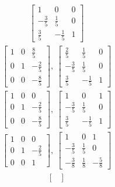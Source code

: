\documentclass[12pt]{article}
\begin{document}
\begin{enumerate}
\begin{align*}
      \begin{bmatrix}
        1 & 0 & 0\\
        -\frac{3}{5} & \frac{1}{5} & 0\\
        \frac{3}{5} & -\frac{1}{5} & 1
      \end{bmatrix}
    \end{align*}
    \begin{align*}
      \begin{bmatrix}
        1 & 0 & \frac{8}{5}\\
        0 & 1 & -\frac{2}{5}\\
        0 & 0 & -\frac{8}{5}
      \end{bmatrix},\
      \begin{bmatrix}
        \frac{2}{5} & \frac{1}{5} & 0\\
        -\frac{3}{5} & \frac{1}{5} & 0\\
        \frac{3}{5} & -\frac{1}{5} & 1
      \end{bmatrix}
    \end{align*}
    \begin{align*}
      \begin{bmatrix}
        1 & 0 & 0\\
        0 & 1 & -\frac{2}{5}\\
        0 & 0 & -\frac{8}{5}
      \end{bmatrix},\
      \begin{bmatrix}
        1 & 0 & 1\\
        -\frac{3}{5} & \frac{1}{5} & 0\\
        \frac{3}{5} & -\frac{1}{5} & 1
      \end{bmatrix}
    \end{align*}
    \begin{align*}
      \begin{bmatrix}
        1 & 0 & 0\\
        0 & 1 & -\frac{2}{5}\\
        0 & 0 & 1
      \end{bmatrix},\
      \begin{bmatrix}
        1 & 0 & 1\\
        -\frac{3}{5} & \frac{1}{5} & 0\\
        -\frac{3}{8} & \frac{1}{8} & -\frac{5}{8}
      \end{bmatrix}
    \end{align*}
    \begin{align*}
      \begin{bmatrix}

\end{bmatrix}
\end{align*}
\end{enumerate}
\end{document}
